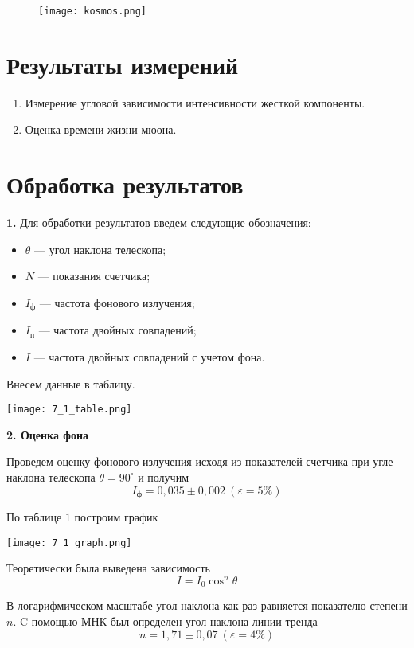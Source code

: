 \documentclass[a4paper,12pt]{article}
\newcommand{\eps}{\varepsilon}
\begin{document}
	\begin{figure}[h!]
		\centering
		\texttt{[image: kosmos.png]}
	\end{figure}

	\section{Результаты измерений}
	
	\begin{enumerate}
		
		\item Измерение угловой зависимости интенсивности жесткой компоненты.
		\item Оценка времени жизни мюона.
	\end{enumerate}
	
	
	\newpage
	\section{Обработка результатов}
	
	{\bf 1. } Для обработки результатов введем следующие обозначения:
	\begin{itemize}
		\item $\theta$ --- угол наклона телескопа;
		\item $N$ --- показания счетчика;
		\item $I_\text{ф}$ --- частота фонового излучения;
		\item  $I_\text{п}$ --- частота двойных совпадений;
		\item $I$ --- частота двойных совпадений с учетом фона.
	\end{itemize}

	Внесем данные в таблицу.
	
	\texttt{[image: 7\_1\_table.png]}
	
	{\bf 2. Оценка фона} 
	
	Проведем оценку фонового излучения исходя из показателей счетчика при угле наклона телескопа $\theta = 90^\circ$ и получим
	$$I_\text{ф} = 0,035\pm 0,002\ (\eps = 5\%)$$
	
	По таблице $1$ построим график
	
	\texttt{[image: 7\_1\_graph.png]}
	
	Теоретически была выведена зависимость 
	$$I = I_0 \cos^n\theta$$
	
	В логарифмическом масштабе угол наклона как раз равняется показателю степени $n$. 
	C помощью МНК был определен угол наклона линии тренда
	$$n = 1,71\pm 0,07\ (\eps = 4\%)$$
	
\end{document}
